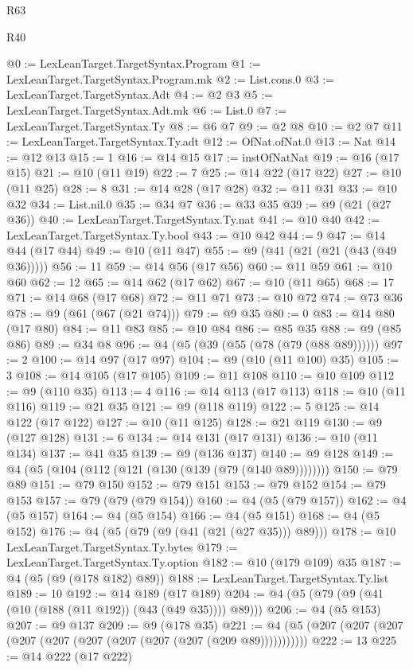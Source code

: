 \begin{lexlean}{R63}
\begin{lexlean}{R40}
\begin{coremodule}
{{{{{{{{{{{{{{{{{{{{{{{{{{{{{{{{{{{{{{{{{{{{{{{{{{{{{{{{{{{{{{{{{{{{{{{{{{{{{{{{{{{{{{{{{{{{{{{{{{{{{{{{{{{{{@0 := LexLeanTarget.TargetSyntax.Program
@1 := LexLeanTarget.TargetSyntax.Program.mk
@2 := List.cons.{0}
@3 := LexLeanTarget.TargetSyntax.Adt
@4 := @2 @3
@5 := LexLeanTarget.TargetSyntax.Adt.mk
@6 := List.{0}
@7 := LexLeanTarget.TargetSyntax.Ty
@8 := @6 @7
@9 := @2 @8
@10 := @2 @7
@11 := LexLeanTarget.TargetSyntax.Ty.adt
@12 := OfNat.ofNat.{0}
@13 := Nat
@14 := @12 @13
@15 := 1
@16 := @14 @15
@17 := instOfNatNat
@19 := @16 (@17 @15)
@21 := @10 (@11 @19)
@22 := 7
@25 := @14 @22 (@17 @22)
@27 := @10 (@11 @25)
@28 := 8
@31 := @14 @28 (@17 @28)
@32 := @11 @31
@33 := @10 @32
@34 := List.nil.{0}
@35 := @34 @7
@36 := @33 @35
@39 := @9 (@21 (@27 @36))
@40 := LexLeanTarget.TargetSyntax.Ty.nat
@41 := @10 @40
@42 := LexLeanTarget.TargetSyntax.Ty.bool
@43 := @10 @42
@44 := 9
@47 := @14 @44 (@17 @44)
@49 := @10 (@11 @47)
@55 := @9 (@41 (@21 (@21 (@43 (@49 @36)))))
@56 := 11
@59 := @14 @56 (@17 @56)
@60 := @11 @59
@61 := @10 @60
@62 := 12
@65 := @14 @62 (@17 @62)
@67 := @10 (@11 @65)
@68 := 17
@71 := @14 @68 (@17 @68)
@72 := @11 @71
@73 := @10 @72
@74 := @73 @36
@78 := @9 (@61 (@67 (@21 @74)))
@79 := @9 @35
@80 := 0
@83 := @14 @80 (@17 @80)
@84 := @11 @83
@85 := @10 @84
@86 := @85 @35
@88 := @9 (@85 @86)
@89 := @34 @8
@96 := @4 (@5 (@39 (@55 (@78 (@79 (@88 @89))))))
@97 := 2
@100 := @14 @97 (@17 @97)
@104 := @9 (@10 (@11 @100) @35)
@105 := 3
@108 := @14 @105 (@17 @105)
@109 := @11 @108
@110 := @10 @109
@112 := @9 (@110 @35)
@113 := 4
@116 := @14 @113 (@17 @113)
@118 := @10 (@11 @116)
@119 := @21 @35
@121 := @9 (@118 @119)
@122 := 5
@125 := @14 @122 (@17 @122)
@127 := @10 (@11 @125)
@128 := @21 @119
@130 := @9 (@127 @128)
@131 := 6
@134 := @14 @131 (@17 @131)
@136 := @10 (@11 @134)
@137 := @41 @35
@139 := @9 (@136 @137)
@140 := @9 @128
@149 := @4 (@5 (@104 (@112 (@121 (@130 (@139 (@79 (@140 @89))))))))
@150 := @79 @89
@151 := @79 @150
@152 := @79 @151
@153 := @79 @152
@154 := @79 @153
@157 := @79 (@79 (@79 @154))
@160 := @4 (@5 (@79 @157))
@162 := @4 (@5 @157)
@164 := @4 (@5 @154)
@166 := @4 (@5 @151)
@168 := @4 (@5 @152)
@176 := @4 (@5 (@79 (@9 (@41 (@21 (@27 @35))) @89)))
@178 := @10 LexLeanTarget.TargetSyntax.Ty.bytes
@179 := LexLeanTarget.TargetSyntax.Ty.option
@182 := @10 (@179 @109) @35
@187 := @4 (@5 (@9 (@178 @182) @89))
@188 := LexLeanTarget.TargetSyntax.Ty.list
@189 := 10
@192 := @14 @189 (@17 @189)
@204 := @4 (@5 (@79 (@9 (@41 (@10 (@188 (@11 @192)) (@43 (@49 @35)))) @89)))
@206 := @4 (@5 @153)
@207 := @9 @137
@209 := @9 (@178 @35)
@221 := @4 (@5 (@207 (@207 (@207 (@207 (@207 (@207 (@207 (@207 (@207 (@209 @89)))))))))))
@222 := 13
@225 := @14 @222 (@17 @222)
}}}}}}}}}}}}}}}}}}}}}}}}}}}}}}}}}}}}}}}}}}}}}}}}}}}}}}}}}}}}}}}}}}}}}}}}}}}}}}}}}}}}}}}}}}}}}}}}}}}}}}}}}}}}}
\end{coremodule}
\end{lexlean}
\end{lexlean}
